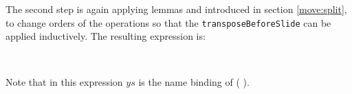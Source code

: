 \documentclass{l4proj}
\begin{document}
The second step is again applying lemmas  and  introduced in section \ref{move:split}, to change orders of the operations so that the \texttt{transposeBeforeSlide} can be applied inductively. The resulting expression is:
\begin{code}
\>[4]\AgdaSpace{}%
\AgdaSymbol{(}\AgdaSpace{}%
\AgdaSymbol{(}\AgdaSpace{}%
\AgdaSymbol{)}\AgdaSpace{}%
\AgdaSymbol{)}\AgdaSpace{}%
\<%
\\
\>[4]\AgdaSpace{}%
\AgdaSpace{}%
\AgdaSymbol{(}\AgdaSpace{}%
\AgdaSymbol{(}\AgdaSpace{}%
\AgdaSymbol{(}\AgdaSpace{}%
\AgdaSpace{}%
\AgdaSymbol{)}\AgdaSpace{}%
\AgdaSymbol{(}\AgdaSpace{}%
\AgdaSymbol{(}\AgdaSpace{}%
\AgdaSymbol{(}\AgdaSpace{}%
\AgdaSymbol{))}\AgdaSpace{}%
\AgdaSymbol{)))}\<%
\end{code}
Note that in this expression $ys$ is the name binding of (\AgdaSpace{}%
\AgdaSymbol{(}\AgdaSpace{}%
\AgdaSymbol{(}\AgdaSpace{}%
\AgdaSpace{}%
\AgdaSpace{}%
\AgdaSymbol{))}\AgdaSpace{}%
\AgdaSpace{}).
\end{document}
